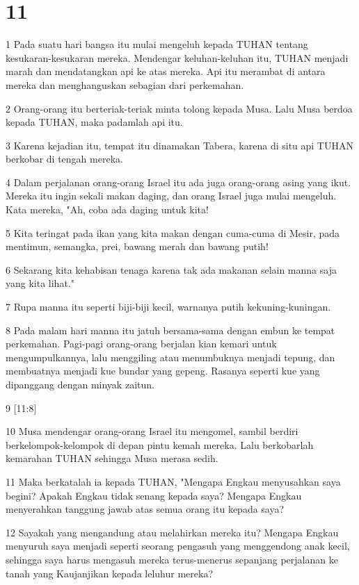 \chapter{11}

\par 1 Pada suatu hari bangsa itu mulai mengeluh kepada TUHAN tentang kesukaran-kesukaran mereka. Mendengar keluhan-keluhan itu, TUHAN menjadi marah dan mendatangkan api ke atas mereka. Api itu merambat di antara mereka dan menghanguskan sebagian dari perkemahan.
\par 2 Orang-orang itu berteriak-teriak minta tolong kepada Musa. Lalu Musa berdoa kepada TUHAN, maka padamlah api itu.
\par 3 Karena kejadian itu, tempat itu dinamakan Tabera, karena di situ api TUHAN berkobar di tengah mereka.
\par 4 Dalam perjalanan orang-orang Israel itu ada juga orang-orang asing yang ikut. Mereka itu ingin sekali makan daging, dan orang Israel juga mulai mengeluh. Kata mereka, "Ah, coba ada daging untuk kita!
\par 5 Kita teringat pada ikan yang kita makan dengan cuma-cuma di Mesir, pada mentimun, semangka, prei, bawang merah dan bawang putih!
\par 6 Sekarang kita kehabisan tenaga karena tak ada makanan selain manna saja yang kita lihat."
\par 7 Rupa manna itu seperti biji-biji kecil, warnanya putih kekuning-kuningan.
\par 8 Pada malam hari manna itu jatuh bersama-sama dengan embun ke tempat perkemahan. Pagi-pagi orang-orang berjalan kian kemari untuk mengumpulkannya, lalu menggiling atau menumbuknya menjadi tepung, dan membuatnya menjadi kue bundar yang gepeng. Rasanya seperti kue yang dipanggang dengan minyak zaitun.
\par 9 [11:8]
\par 10 Musa mendengar orang-orang Israel itu mengomel, sambil berdiri berkelompok-kelompok di depan pintu kemah mereka. Lalu berkobarlah kemarahan TUHAN sehingga Musa merasa sedih.
\par 11 Maka berkatalah ia kepada TUHAN, "Mengapa Engkau menyusahkan saya begini? Apakah Engkau tidak senang kepada saya? Mengapa Engkau menyerahkan tanggung jawab atas semua orang itu kepada saya?
\par 12 Sayakah yang mengandung atau melahirkan mereka itu? Mengapa Engkau menyuruh saya menjadi seperti seorang pengasuh yang menggendong anak kecil, sehingga saya harus mengasuh mereka terus-menerus sepanjang perjalanan ke tanah yang Kaujanjikan kepada leluhur mereka?
